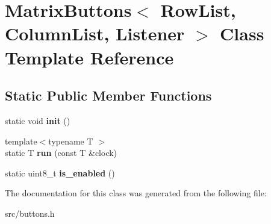 \hypertarget{classMatrixButtons}{}\section{Matrix\+Buttons$<$ Row\+List, Column\+List, Listener $>$ Class Template Reference}
\label{classMatrixButtons}
\subsection*{Static Public Member Functions}
\begin{DoxyCompactItemize}
\item 
\hypertarget{classMatrixButtons_a28aaefa849e34b188d2a74293ead0e41}{}\label{classMatrixButtons_a28aaefa849e34b188d2a74293ead0e41} 
static void {\bfseries init} ()
\item 
\hypertarget{classMatrixButtons_a8a751df6ba30a66be953d4098e8eadb3}{}\label{classMatrixButtons_a8a751df6ba30a66be953d4098e8eadb3} 
{\footnotesize template$<$typename T $>$ }\\static T {\bfseries run} (const T \&clock)
\item 
\hypertarget{classMatrixButtons_ac9394408a6020172ef35dfaebed40784}{}\label{classMatrixButtons_ac9394408a6020172ef35dfaebed40784} 
static uint8\+\_\+t {\bfseries is\+\_\+enabled} ()
\end{DoxyCompactItemize}


The documentation for this class was generated from the following file\+:\begin{DoxyCompactItemize}
\item 
src/buttons.\+h\end{DoxyCompactItemize}
